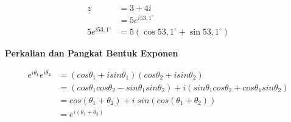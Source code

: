 \documentclass{article}
\begin{document}
\begin{align}
    z                   & = 3 + 4i
    \nonumber                                                        \\
                        & = 5e^{i 53,1^{\circ}}
    \nonumber                                                        \\
    5e^{i 53,1^{\circ}} & = 5(\cos 53,1^{\circ} + \sin 53,1^{\circ})
    \nonumber
\end{align}



\newpage
\begin{center}
    \textbf{Perkalian dan Pangkat Bentuk Exponen}
\end{center}
\begin{align}
    e^{i\theta_1} e^{i\theta_2} & = (cos\theta_1 + i sin\theta_1)(cos\theta_2 + i sin\theta_2)
    \nonumber                                                                                                                                \\
                                & =(cos\theta_1 cos\theta_2 - sin\theta_1 sin\theta_2) + i(sin\theta_1cos\theta_2 + cos\theta_1 sin\theta_2)
    \nonumber                                                                                                                                \\
                                & = cos(\theta_1 + \theta_2) + i\;sin(cos(\theta_1 + \theta_2))
    \nonumber                                                                                                                                \\
                                & = e^{i(\theta_1 + \theta_2)}
    \nonumber
\end{align}
\end{document}
